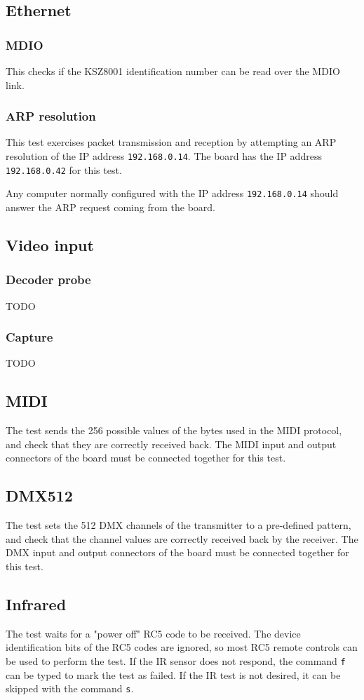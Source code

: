 \documentclass[a4paper,11pt]{article}
\begin{document}
\subsection{Ethernet}
\subsubsection{MDIO}
This checks if the KSZ8001 identification number can be read over the MDIO link.

\subsubsection{ARP resolution}
This test exercises packet transmission and reception by attempting an ARP resolution of the IP address \verb!192.168.0.14!. The board has the IP address \verb!192.168.0.42! for this test.

Any computer normally configured with the IP address \verb!192.168.0.14! should answer the ARP request coming from the board.

\subsection{Video input}
\subsubsection{Decoder probe}
TODO
\subsubsection{Capture}
TODO

\subsection{MIDI}
The test sends the 256 possible values of the bytes used in the MIDI protocol, and check that they are correctly received back. The MIDI input and output connectors of the board must be connected together for this test.

\subsection{DMX512}
The test sets the 512 DMX channels of the transmitter to a pre-defined pattern, and check that the channel values are correctly received back by the receiver. The DMX input and output connectors of the board must be connected together for this test.

\subsection{Infrared}
The test waits for a "power off" RC5 code to be received. The device identification bits of the RC5 codes are ignored, so most RC5 remote controls can be used to perform the test. If the IR sensor does not respond, the command \verb!f! can be typed to mark the test as failed. If the IR test is not desired, it can be skipped with the command \verb!s!.
\end{document}
